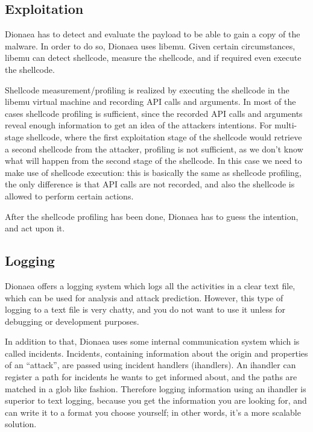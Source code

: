 \documentclass[epsfig,a4paper,11pt,titlepage,oneside,openany]{book}
\begin{document}
\subsection{Exploitation}

Dionaea has to detect and evaluate the payload to be able to gain a copy of the malware. In order to do so, Dionaea uses libemu. Given certain circumstances, libemu can detect shellcode, measure the shellcode, and if required even execute the shellcode.

Shellcode measurement/profiling is realized by executing the shellcode in the libemu virtual machine and recording API calls and arguments. In most of the cases shellcode profiling is sufficient, since the recorded API calls and arguments reveal enough information to get an idea of the attackers intentions. For multi-stage shellcode, where the first exploitation stage of the shellcode would retrieve a second shellcode from the attacker, profiling is not sufficient, as we don’t know what will happen from the second stage of the shellcode. In this case we need to make use of shellcode execution: this is basically the same as shellcode profiling, the only difference is that API calls are not recorded, and also the shellcode is allowed to perform certain actions.

After the shellcode profiling has been done, Dionaea has to guess the intention, and act upon it.

\subsection{Logging}

Dionaea offers a logging system which logs all the activities in a clear text file, which can be used for analysis and attack prediction. However, this type of logging to a text file is very chatty, and you do not want to use it unless for debugging or development purposes.

In addition to that, Dionaea uses some internal communication system which is called incidents. Incidents, containing information about the origin and properties of an “attack”, are passed using incident handlers (ihandlers). An ihandler can register a path for incidents he wants to get informed about, and  the paths are matched in a glob like fashion. Therefore logging information using an ihandler is superior to text logging, because you get the information you are looking for, and can write it to a format you choose yourself; in other words, it’s a more scalable solution.
\end{document}
